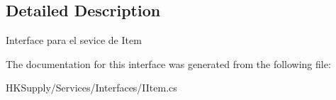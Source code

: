 \subsection{Detailed Description}
Interface para el sevice de Item 



The documentation for this interface was generated from the following file\+:\begin{DoxyCompactItemize}
\item 
H\+K\+Supply/\+Services/\+Interfaces/I\+Item.\+cs\end{DoxyCompactItemize}
